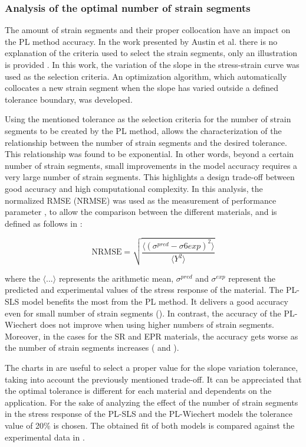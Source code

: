 \subsubsection{Analysis of the optimal number of strain segments}

The amount of strain segments and their proper collocation have an impact on the PL method accuracy. In the work presented by Austin et al. there is no explanation of the criteria used to select the strain segments, only an illustration is provided \cite{austin2015control}. In this work, the variation of the slope in the stress-strain curve was used as the selection criteria. An optimization algorithm, which automatically collocates a new strain segment when the slope has varied outside a defined tolerance boundary, was developed.

Using the mentioned tolerance as the selection criteria for the number of strain segments to be created by the PL method, allows the characterization of the relationship between the number of strain segments and the desired tolerance. This relationship was found to be exponential. In other words, beyond a certain number of strain segments, small improvements in the model accuracy requires a very large number of strain segments. This highlights a design trade-off between good accuracy and high computational complexity. In this analysis, the normalized RMSE (NRMSE) was used as the measurement of performance parameter \cite{bergstrom2015mechanics}, to allow the comparison between the different materials, and is defined as follows in :

\begin{equation}
    \mathrm{NRMSE} = \sqrt{  \frac{\langle (\sigma^{pred} - \sigma6{exp})^2 \rangle}{\langle Y^2 \rangle} }
\label{eq2}
\end{equation}

\noindent where the  $\langle ... \rangle$ represents the arithmetic mean, $\sigma^{pred}$ and $\sigma^{exp}$ represent the predicted and experimental values of the stress response of the material. The PL-SLS model benefits the most from the PL method. It delivers a good accuracy even for small number of strain segments (). In contrast, the accuracy of the PL-Wiechert does not improve when using higher numbers of strain segments. Moreover, in the cases for the SR and EPR materials, the accuracy gets worse as the number of strain segments increases ( and ).

The charts in  are useful to select a proper value for the slope variation tolerance, taking into account the previously mentioned trade-off. It can be appreciated that the optimal tolerance is different for each material and dependents on the application. For the sake of analyzing the effect of the number of strain segments in the stress response of the PL-SLS and the PL-Wiechert models the tolerance value of 20\% is chosen. The obtained fit of both models is compared against the experimental data in .


